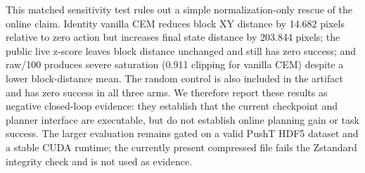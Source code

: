 \documentclass{article}
\begin{document}
\begin{table}[H]
\centering
\scriptsize
\setlength{\tabcolsep}{3pt}
\caption{Matched live PushT planning sensitivity to action normalization.
Every cell uses the same four seeds and the same CEM protocol within the
matrix.  Lower distance is favorable; higher return is favorable; clipping is
the fraction of executed action coordinates at the bound.  No cell achieved
task success.}
\label{tab:supp-online-normalization}
\end{table}

This matched sensitivity test rules out a simple normalization-only rescue of
the online claim.  Identity vanilla CEM reduces block XY distance by 14.682
pixels relative to zero action but increases final state distance by 203.844
pixels; the public live z-score leaves block distance unchanged and still has
zero success; and raw/100 produces severe saturation (0.911 clipping for
vanilla CEM) despite a lower block-distance mean.  The random control is also
included in the artifact and has zero success in all three arms.  We therefore
report these results as negative closed-loop evidence: they establish that the
current checkpoint and planner interface are executable, but do not establish
online planning gain or task success.  The larger evaluation remains gated on
a valid PushT HDF5 dataset and a stable CUDA runtime; the currently present
compressed file fails the Zstandard integrity check and is not used as
evidence.
\end{document}
